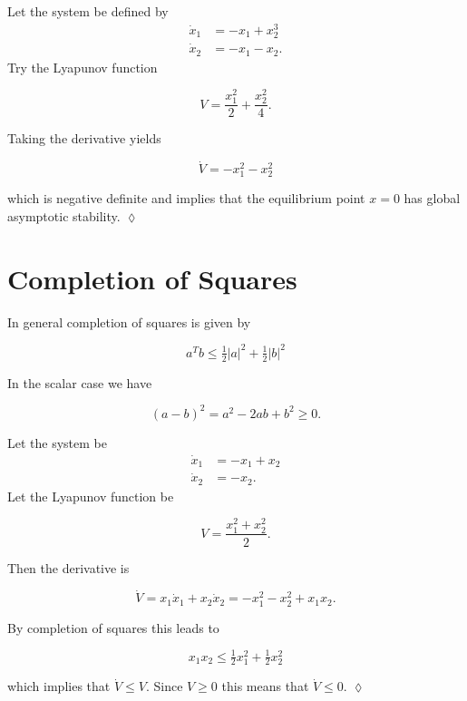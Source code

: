 \begin{example}
Let the system be defined by
\begin{align*}
\dot{x}_1 &= -x_1 + x_2^3 \\
\dot{x}_2 &= -x_1 - x_2.
\end{align*}
Try the Lyapunov function

\begin{equation*}
V = \frac{x_1^2}{2} + \frac{x_2^2}{4}.
\end{equation*}

Taking the derivative yields

\begin{equation*}
\dot{V} = -x_1^2 - x_2^2
\end{equation*}

which is negative definite and implies that the equilibrium point $x=0$ has global asymptotic stability.
$\lozenge$
\end{example}

\section{Completion of Squares}
In general completion of squares is given by

\begin{equation*}
a^T b \leq \tfrac{1}{2}|a|^2 + \tfrac{1}{2}|b|^2
\end{equation*}

In the scalar case we have

\begin{equation*}
{(a-b)}^2 = a^2 - 2ab + b^2 \geq 0.
\end{equation*}

\begin{example}
Let the system be
\begin{align*}
\dot{x}_1 &= -x_1 + x_2 \\
\dot{x}_2 &= -x_2.
\end{align*}
Let the Lyapunov function be

\begin{equation*}
V = \frac{x_1^2+x_2^2}{2}.
\end{equation*}

Then the derivative is

\begin{equation*}
\dot{V} = x_1\dot{x}_1 + x_2\dot{x}_2 = -x_1^2 - x_2^2 + x_1x_2.
\end{equation*}

By completion of squares this leads to

\begin{equation*}
x_1x_2 \leq \tfrac{1}{2}x_1^2 + \tfrac{1}{2}x_2^2
\end{equation*}

which implies that $\dot{V} \leq V$.
Since $V \geq 0$ this means that $\dot{V} \leq 0$.
$\lozenge$
\end{example}

